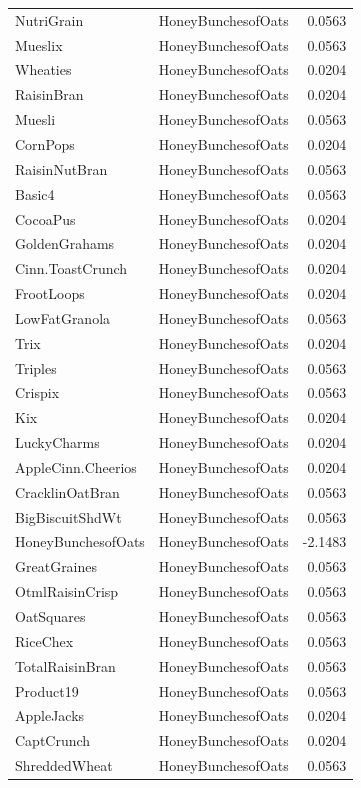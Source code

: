 \begin{longtable}{llr}
NutriGrain & HoneyBunchesofOats & 0.0563 \\
Mueslix & HoneyBunchesofOats & 0.0563 \\
Wheaties & HoneyBunchesofOats & 0.0204 \\
RaisinBran & HoneyBunchesofOats & 0.0204 \\
Muesli & HoneyBunchesofOats & 0.0563 \\
CornPops & HoneyBunchesofOats & 0.0204 \\
RaisinNutBran & HoneyBunchesofOats & 0.0563 \\
Basic4 & HoneyBunchesofOats & 0.0563 \\
CocoaPus & HoneyBunchesofOats & 0.0204 \\
GoldenGrahams & HoneyBunchesofOats & 0.0204 \\
Cinn.ToastCrunch & HoneyBunchesofOats & 0.0204 \\
FrootLoops & HoneyBunchesofOats & 0.0204 \\
LowFatGranola & HoneyBunchesofOats & 0.0563 \\
Trix & HoneyBunchesofOats & 0.0204 \\
Triples & HoneyBunchesofOats & 0.0563 \\
Crispix & HoneyBunchesofOats & 0.0563 \\
Kix & HoneyBunchesofOats & 0.0204 \\
LuckyCharms & HoneyBunchesofOats & 0.0204 \\
AppleCinn.Cheerios & HoneyBunchesofOats & 0.0204 \\
CracklinOatBran & HoneyBunchesofOats & 0.0563 \\
BigBiscuitShdWt & HoneyBunchesofOats & 0.0563 \\
HoneyBunchesofOats & HoneyBunchesofOats & -2.1483 \\
GreatGraines & HoneyBunchesofOats & 0.0563 \\
OtmlRaisinCrisp & HoneyBunchesofOats & 0.0563 \\
OatSquares & HoneyBunchesofOats & 0.0563 \\
RiceChex & HoneyBunchesofOats & 0.0563 \\
TotalRaisinBran & HoneyBunchesofOats & 0.0563 \\
Product19 & HoneyBunchesofOats & 0.0563 \\
AppleJacks & HoneyBunchesofOats & 0.0204 \\
CaptCrunch & HoneyBunchesofOats & 0.0204 \\
ShreddedWheat & HoneyBunchesofOats & 0.0563 \\

\end{longtable}

